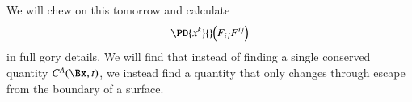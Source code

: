 We will chew on this tomorrow and calculate
%
\begin{equation}\label{eqn:relativisticElectrodynamicsL21b:540}
\PD{x^k}{} \Bigl( F_{i j} F^{i j} \Bigr)
\end{equation}
%
in full gory details.  We will find that instead of finding a single conserved quantity \(C^A(\Bx, t)\), we instead find a quantity that only changes through escape from the boundary of a surface.
